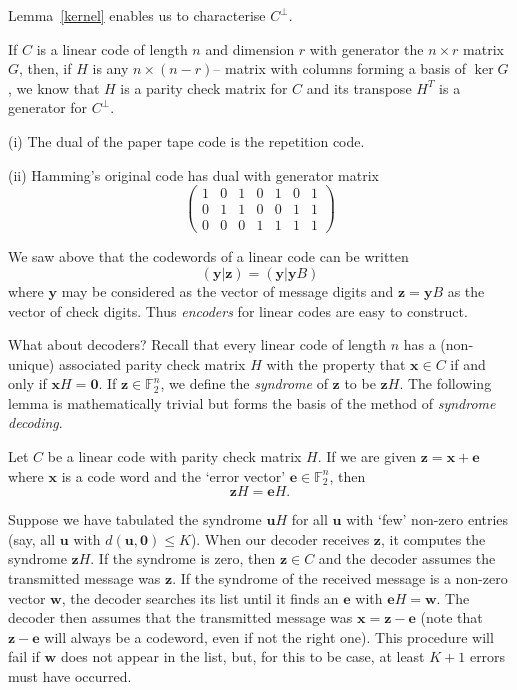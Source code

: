 Lemma~\ref{kernel} enables us to characterise
$C^{\perp}$.
\begin{lemma} If $C$ is a linear code of length $n$
and dimension $r$ with generator the $n\times r$
matrix $G$, then, if $H$ is any $n\times(n-r)$--
matrix with columns forming a basis of $\ker G$,
we know that $H$ is a parity check
matrix for $C$ and its transpose $H^{T}$ is a
generator for $C^{\perp}$.
\end{lemma}
\begin{example} (i) The dual of the paper tape
code  is the repetition code.

(ii) Hamming's original code has dual with generator
matrix
\[\begin{pmatrix}
1&0&1&0&1&0&1\\
0&1&1&0&0&1&1\\
0&0&0&1&1&1&1
\end{pmatrix}\]
\end{example}

We saw above that the codewords of a linear code
can be written
\[({\mathbf y}|{\mathbf z})=({\mathbf y}|{\mathbf y}B)\]
where ${\mathbf y}$ may be considered as the vector
of message
digits and ${\mathbf z}={\mathbf y}B$ as the vector
of check digits. Thus \emph{encoders} for linear
codes are easy to construct.

What about decoders? Recall that every linear code
of length $n$ has
a (non-unique) associated  parity check matrix $H$
with the property that ${\mathbf x}\in C$ if and only
if ${\mathbf x}H={\boldsymbol 0}$. If
${\mathbf z}\in{\mathbb F}_{2}^{n}$,
we define the \emph{syndrome}
of ${\mathbf z}$ to be ${\mathbf z}H$.
The following lemma is mathematically trivial
but forms the basis of the method of
\emph{syndrome decoding}.
\begin{lemma} Let $C$ be a linear code with
parity check matrix $H$.
If we are given
${\mathbf z}={\mathbf x}+{\mathbf e}$
where ${\mathbf x}$ is a code word
and the `error vector'
${\mathbf e}\in{\mathbb F}_{2}^{n}$,
then
\[{\mathbf z}H={\mathbf e}H.\]
\end{lemma}
Suppose we have tabulated the syndrome ${\mathbf u}H$
for all ${\mathbf u}$ with `few' non-zero entries
(say, all ${\mathbf u}$ with
$d({\mathbf u},{\boldsymbol 0})\leq K$).
When our decoder receives ${\mathbf z}$, it computes the
syndrome ${\mathbf z}H$. If the syndrome is zero,
then ${\mathbf z}\in C$ and the decoder assumes
the transmitted message was ${\mathbf z}$. If
the syndrome of the received message is a non-zero
vector ${\mathbf w}$, the decoder searches its list
until it finds an ${\mathbf e}$  with
${\mathbf e}H={\mathbf w}$. The decoder then
assumes that the transmitted message was
${\mathbf x}={\mathbf z}-{\mathbf e}$
(note that ${\mathbf z}-{\mathbf e}$ will
always be a codeword, even if not the right one).
This procedure will fail if ${\mathbf w}$
does not appear in the list, but, for this to
be case, at least $K+1$
errors must have occurred.

